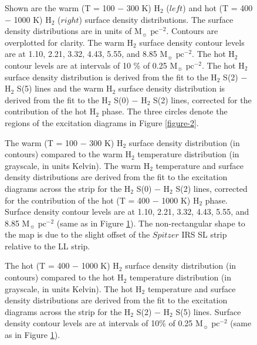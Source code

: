\documentclass[manuscript]{aastex}
\begin{document}
\clearpage

\begin{figure}
\caption{Shown are the warm (T = 100 $-$ 300 K) 
$\mathrm{H_2}$ ($left$) and hot (T = 400 $-$ 1000 K) 
$\mathrm{H_2}$ ($right$) surface density distributions.  The surface density
 distributions are in units of $\mathrm{M_\sun}$ 
$\mathrm{pc^{-2}}$.   Contours are overplotted for clarity.  
The warm $\mathrm{H_2}$ surface density contour levels are at 
1.10, 2.21, 3.32, 4.43, 5.55, and 8.85 $\mathrm{M_\sun}$ $\mathrm{pc^{-2}}$.  
The hot $\mathrm{H_2}$ contour 
levels are at intervals of 10 \% of 0.25 $\mathrm{M_\sun}$ $\mathrm{pc^{-2}}$.  
The hot $\mathrm{H_2}$ surface density distribution is derived 
from the fit to the $\mathrm{H_2}$ S(2) $-$ 
$\mathrm{H_2}$ S(5) lines and the warm $\mathrm{H_2}$ 
surface density distribution is derived from the fit to the 
$\mathrm{H_2}$ S(0) $-$ $\mathrm{H_2}$ S(2) lines, 
corrected for the contribution of the hot $\mathrm{H_2}$ phase.
The three circles denote the regions of the excitation diagrams in Figure \ref{figure-2}.}
\label{figure-3}
\end{figure}

\clearpage

\begin{figure}
\caption{The warm (T = 100 $-$ 300 K) $\mathrm{H_2}$ surface 
density distribution (in contours) compared 
to the warm $\mathrm{H_2}$ temperature distribution (in grayscale, in units Kelvin).  The warm $\mathrm{H_2}$ temperature and surface density distributions are derived from the fit to the excitation 
diagrams across the strip for the $\mathrm{H_2}$ S(0) $-$ $\mathrm{H_2}$ S(2) lines, 
corrected for the contribution of the hot (T = 400 $-$ 1000 K) $\mathrm{H_2}$ phase.  
Surface density contour levels are at 
1.10, 2.21, 3.32, 4.43, 5.55, and 8.85 $\mathrm{M_\sun}$ $\mathrm{pc^{-2}}$ (same as in Figure \ref{figure-3}). The non-rectangular shape to the map is due to the slight offset of the $Spitzer$ IRS SL 
strip relative to the LL strip.}
\label{figure-4}
\end{figure}

\clearpage
\begin{figure}
\caption{The hot (T = 400 $-$ 1000 K) $\mathrm{H_2}$ surface density distribution (in contours) compared to the hot $\mathrm{H_2}$ temperature distribution (in grayscale, in units Kelvin).  The hot $\mathrm{H_2}$ temperature and surface density distributions are derived from the fit to the excitation diagrams across the strip for the $\mathrm{H_2}$ S(2) $-$ $\mathrm{H_2}$ S(5) lines.  Surface density 
contour levels are at intervals of 10\% of 0.25 $\mathrm{M_\sun}$ $\mathrm{pc^{-2}}$ (same as in Figure \ref{figure-3}).}
\label{figure-5}
\end{figure}
\end{document}
